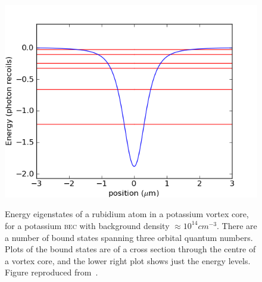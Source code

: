\begin{figure}
{\includegraphics[width=0.5\columnwidth]{figures/velocimetry/levels1e14.png}}
\caption{Energy eigenstates of a rubidium atom in a potassium vortex core, for a potassium \textsc{bec} with background density $\approx 10^{14}\unit{cm}^{-3}$. There are a number of bound states spanning three orbital quantum numbers. Plots of the bound states are of a cross section through the centre of a vortex core, and the lower right plot shows just the energy levels. Figure reproduced from~\cite{billington_particle_2010}.}%
\label{fig:levels1e14}%
\end{figure}

